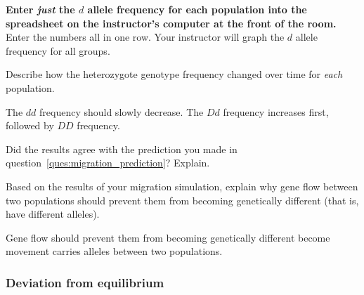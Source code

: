 \documentclass[12pt, hidelinks]{exam}
\newcommand*\AnswerBox[2]{%
    \parbox[t][#1]{0.92\textwidth}{%
    \begin{solution}#2\end{solution}}
    \vspace*{\stretch{0.1}}
}
\newcommand*\AnswerBoxNS[2]{%
	\parbox[t][#1]{0.92\textwidth}{%
		\begin{solution}#2\end{solution}}
}
\newlength{\basespace}
\newcommand{\allele}[1]{$#1$}
\begin{document}
\begin{questions}
\begin{enumerate}
\end{enumerate}

\question
\textbf{Enter \emph{just} the \allele{d} allele frequency for each population into the spreadsheet on the instructor's
computer at the front of the room.}  Enter the numbers all 
in one row. Your instructor will graph the \allele{d} allele frequency for 
all groups.



\question
Describe how the heterozygote genotype frequency changed over time for \emph{each} population.

\AnswerBox{0.05\textheight}{The \allele{dd} frequency should slowly decrease. The \allele{Dd} frequency increases first, followed by \allele{DD} frequency.}

\question
Did the results agree with the prediction you made in question~\ref{ques:migration_prediction}? Explain.

\AnswerBox{0.05\textheight}{%
}

\question[Checkout]
Based on the results of your migration simulation, explain why gene flow between two populations should prevent them from becoming genetically different (that is, have different alleles).

\AnswerBoxNS{0.1\textheight}{Gene flow should prevent them from becoming genetically different become movement carries alleles between two populations.}




%
%
%

\subsubsection*{Deviation from equilibrium}


\end{questions}
\end{document}
